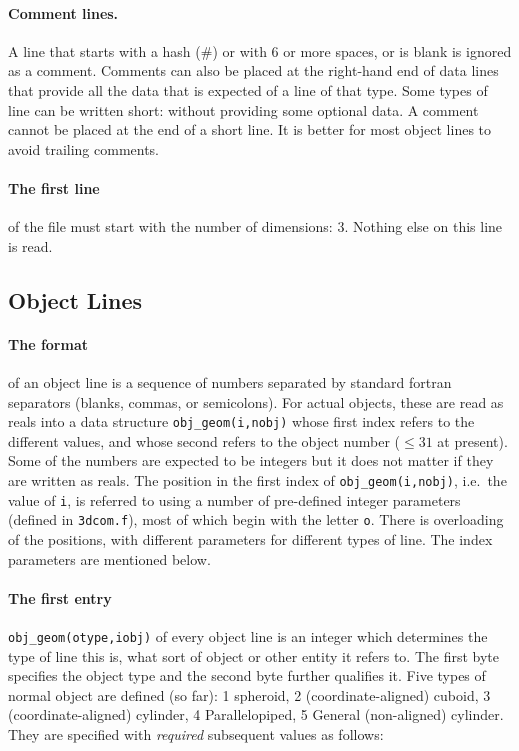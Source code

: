 \documentclass[12pt]{article}
\begin{document}
\paragraph{Comment lines.} A line that starts with a hash (\#) 
or with 6 or more spaces, or is blank is ignored as a
comment. Comments can also be placed at the right-hand end of data
lines that provide all the data that is expected of a line of that
type. Some types of line can be written short: without providing some
optional data. A comment cannot be placed at the end of a short line.
It is better for most object lines to avoid trailing comments.

\paragraph{The first line} of the file must start with the number of
dimensions: 3. Nothing else on this line is read.

\subsection{Object Lines}

\paragraph{The format} of an object line is a sequence of numbers
separated by standard fortran separators (blanks, commas, or
semicolons). For actual objects, these are read as reals into a data
structure \verb!obj_geom(i,nobj)! whose first index refers to the
different values, and whose second refers to the object number
($\le31$ at present).  Some of the numbers are expected to be integers
but it does not matter if they are written as reals. The position in
the first index of \verb!obj_geom(i,nobj)!, i.e.\ the value of
\verb!i!, is referred to using a number of pre-defined integer
parameters (defined in \verb!3dcom.f!), most of which begin with the
letter \verb!o!. There is overloading of the positions, with different
parameters for different types of line. The index parameters are
mentioned below.

\paragraph{The first entry} 
\verb!obj_geom(otype,iobj)! of every object line is an integer which
determines the type of line this is, what sort of object or other
entity it refers to. The first byte specifies the object type and the
second byte further qualifies it. Five types of normal object are
defined (so far): 1 spheroid, 2 (coordinate-aligned) cuboid, 3
(coordinate-aligned) cylinder, 4 Parallelopiped, 5 General
(non-aligned) cylinder. They are specified with \emph{required}
subsequent values
as follows:
\end{document}
